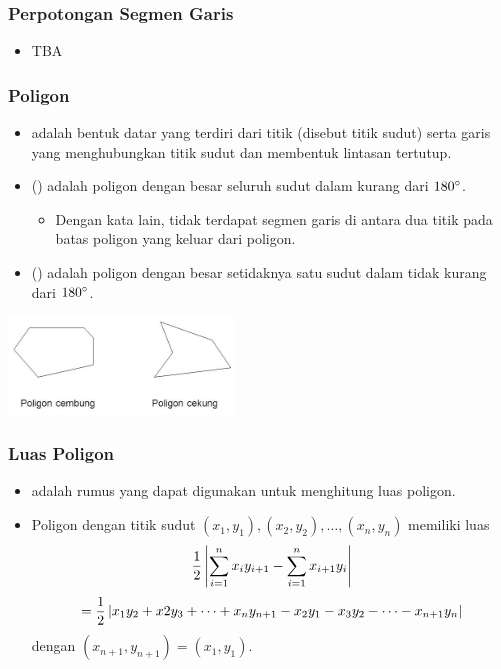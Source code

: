 \begin{frame}
\frametitle{Perpotongan Segmen Garis}
\begin{itemize}
  \item TBA  %
\end{itemize}
\end{frame}

\begin{frame}
\frametitle{Poligon}
\begin{itemize}
  \item {} adalah bentuk datar yang terdiri dari titik (disebut titik sudut) serta garis yang menghubungkan titik sudut dan membentuk lintasan tertutup.
  \item {} (\xspace) adalah poligon dengan besar seluruh sudut dalam kurang dari $180\degree$.
  \begin{itemize}

    \item Dengan kata lain, tidak terdapat segmen garis di antara dua titik pada batas poligon yang keluar dari poligon.
  \end{itemize}
  \item {} (\xspace) adalah poligon dengan besar setidaknya satu sudut dalam tidak kurang dari $180\degree$.
\end{itemize}
\begin{center}
  \includegraphics[width=6cm]{asset/polygon-convex-concave.png}
\end{center}
\end{frame}

\begin{frame}
\frametitle{Luas Poligon}
\begin{itemize}
  \item {} adalah rumus yang dapat digunakan untuk menghitung luas poligon.
  \item Poligon dengan titik sudut $(x_1, y_1), (x_2, y_2), \dots, (x_n, y_n)$ memiliki luas
  \[\frac{1}{2}\left\lvert\sum_{i=1}^n x_iy_{i+1} - \sum_{i=1}^n x_{i+1}y_i\right\rvert\]
  \[= \frac{1}{2}\left\lvert x_1y_2 + x2y_3 + \dots + x_ny_{n+1} - x_2y_1 - x_3y_2 - \dots - x_{n+1}y_n\right\rvert\]
  dengan $(x_{n+1}, y_{n+1}) = (x_1, y_1)$.
\end{itemize}
\end{frame}

